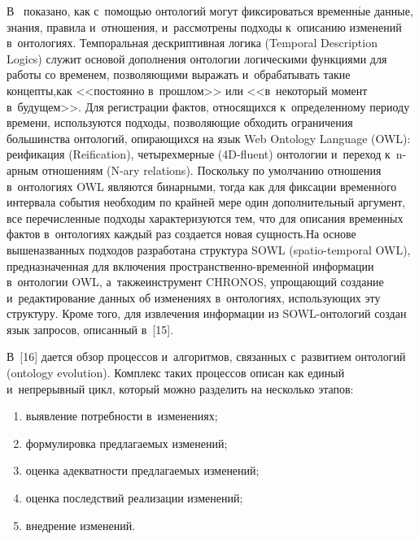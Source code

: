\begin{multicols}{2}
В~\cite{14-gon} показано, как с~помощью онтологий могут фиксироваться 
временн$\acute{\mbox{ы}}$е данные, знания, правила и~отношения, 
и~рассмотрены подходы к~описанию изменений в~онтологиях. Темпоральная 
дескриптивная логика (Temporal Description Logics) служит основой 
дополнения онтологии логическими функциями для работы со временем, 
поз\-во\-ля\-ющи\-ми выражать и~обрабатывать такие концепты,\linebreak как <<постоянно 
в~прошлом>> или <<в~некоторый момент в~будущем>>. Для регистрации 
фактов, относящихся к~определенному периоду времени, используются 
подходы, позволяющие обходить \mbox{ограничения} большинства онтологий, 
опирающихся на язык Web Ontology Language (OWL): реификация 
(Reification), четырехмерные (4D-fluent) онтологии и~переход к~n-ар\-ным 
отношениям (N-ary relations). Поскольку по умолчанию отношения 
в~онтологиях OWL являются бинарными, тогда как для фиксации 
временн$\acute{\mbox{о}}$го интервала события необходим по крайней мере 
один дополнительный аргумент, все перечисленные подходы 
характеризуются тем, что для описания временн$\acute{\mbox{ы}}$х фактов 
в~онтологиях каждый раз создается новая сущность.\linebreak На основе 
вышеназванных подходов разработана структура SOWL (spatio-temporal OWL), пред\-на\-значенная 
для включения %
про\-стран\-ст\-вен\-но-вре\-мен\-н$\acute{\mbox{о}}$й информации 
в~онтологии OWL, а~также\linebreak инструмент CHRONOS, упро\-ща\-ющий создание 
и~редактирование данных об \mbox{изменениях} в~онтологиях, ис\-поль\-зу\-ющих эту 
структуру. Кроме того, для извлечения информации из SOWL-он\-то\-ло\-гий 
создан язык запросов, описанный в~[15].

В~[16] дается обзор процессов и~алгоритмов, связанных с~развитием 
онтологий (ontology evolution). Комплекс таких процессов описан как единый 
и~непрерывный цикл, который можно разделить на несколько этапов: 

\begin{enumerate}[(1)]
\item выявление потребности в~изменениях; 
\item формулировка предлагаемых 
изменений; 
\item оценка адекватности предлагаемых изменений; 
\item оценка 
последствий реализации изменений; 
\item внедрение изменений.
\end{enumerate}


\end{multicols}
